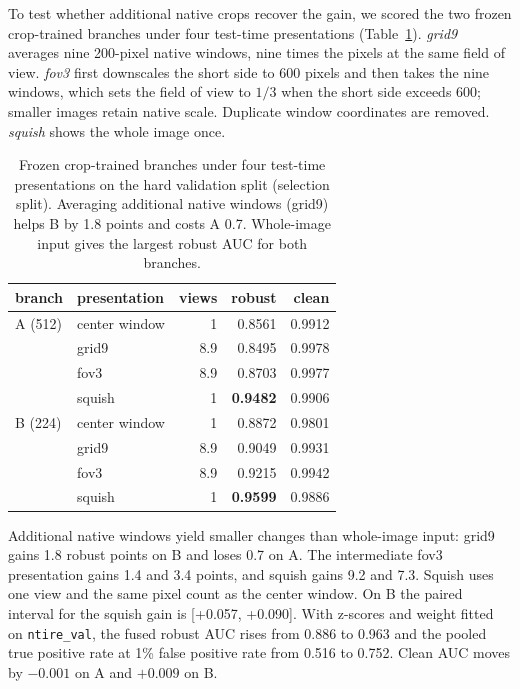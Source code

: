 \documentclass[letterpaper]{article} %
\begin{document}
To test whether additional native crops recover the gain, we scored the two frozen
crop-trained branches under four test-time presentations
(Table~\ref{tab:probe}). \emph{grid9} averages nine 200-pixel native windows,
nine times the pixels at the same field of view. \emph{fov3} first downscales
the short side to 600 pixels and then takes the nine windows, which sets the
field of view to $1/3$ when the short side exceeds 600; smaller images retain native scale. Duplicate window coordinates are removed. \emph{squish} shows the whole image once.

\begin{table}[t]
\centering
\small
\setlength{\tabcolsep}{4pt}
\begin{tabular}{llrrr}
\toprule
branch & presentation & views & robust & clean \\
\midrule
A (512) & center window & 1 & 0.8561 & 0.9912 \\
        & grid9 & 8.9 & 0.8495 & 0.9978 \\
        & fov3 & 8.9 & 0.8703 & 0.9977 \\
        & squish & 1 & \textbf{0.9482} & 0.9906 \\
\midrule
B (224) & center window & 1 & 0.8872 & 0.9801 \\
        & grid9 & 8.9 & 0.9049 & 0.9931 \\
        & fov3 & 8.9 & 0.9215 & 0.9942 \\
        & squish & 1 & \textbf{0.9599} & 0.9886 \\
\bottomrule
\end{tabular}
\caption{Frozen crop-trained branches under four test-time presentations
on the hard validation split (selection split). Averaging additional native windows
(grid9) helps B by 1.8 points and costs A 0.7. Whole-image input gives
the largest robust AUC for both branches.}
\label{tab:probe}
\end{table}

Additional native windows yield smaller changes than whole-image input: grid9 gains 1.8 robust
points on B and loses 0.7 on A. The intermediate fov3 presentation gains 1.4
and 3.4 points, and squish gains 9.2 and 7.3. Squish uses one view and the
same pixel count as the center window. On B the paired interval for the
squish gain is [+0.057, +0.090]. With z-scores and weight fitted on
\texttt{ntire\_val}, the fused robust AUC rises from 0.886 to 0.963 and the
pooled true positive rate at 1\% false positive rate from 0.516 to 0.752. Clean AUC
moves by $-0.001$ on A and $+0.009$ on B.
\end{document}
